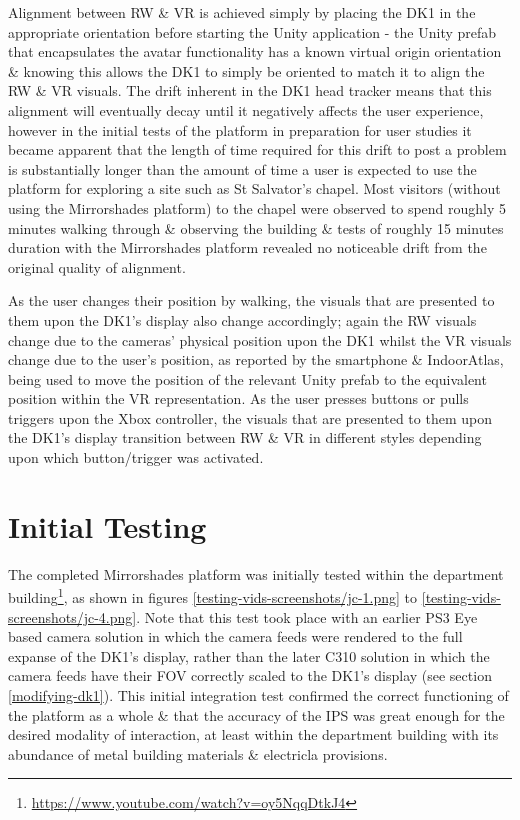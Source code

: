 Alignment between RW \& VR is achieved simply by placing the DK1 in the appropriate orientation before starting the Unity application - the Unity prefab that encapsulates the avatar functionality has a known virtual origin orientation \& knowing this allows the DK1 to simply be oriented to match it to align the RW \& VR visuals. The drift inherent in the DK1 head tracker means that this alignment will eventually decay until it negatively affects the user experience, however in the initial tests of the platform in preparation for user studies it became apparent that the length of time required for this drift to post a problem is substantially longer than the amount of time a user is expected to use the platform for exploring a site such as St Salvator's chapel. Most visitors (without using the Mirrorshades platform) to the chapel were observed to spend roughly 5 minutes walking through \& observing the building \& tests of roughly 15 minutes duration with the Mirrorshades platform revealed no noticeable drift from the original quality of alignment.

As the user changes their position by walking, the visuals that are presented to them upon the DK1's display also change accordingly; again the RW visuals change due to the cameras' physical position upon the DK1 whilst the VR visuals change due to the user's position, as reported by the smartphone \& IndoorAtlas, being used to move the position of the relevant Unity prefab to the equivalent position within the VR representation. As the user presses buttons or pulls triggers upon the Xbox controller, the visuals that are presented to them upon the DK1's display transition between RW \& VR in different styles depending upon which button/trigger was activated.


\section{Initial Testing}
\label{initial-testing}
The completed Mirrorshades platform was initially tested within the department building\footnote{\url{https://www.youtube.com/watch?v=oy5NqqDtkJ4}}, as shown in figures \ref{testing-vids-screenshots/jc-1.png} to \ref{testing-vids-screenshots/jc-4.png}. Note that this test took place with an earlier PS3 Eye based camera solution in which the camera feeds were rendered to the full expanse of the DK1's display, rather than the later C310 solution in which the camera feeds have their FOV correctly scaled to the DK1's display (see section \ref{modifying-dk1}). This initial integration test confirmed the correct functioning of the platform as a whole \& that the accuracy of the IPS was great enough for the desired modality of interaction, at least within the department building with its abundance of metal building materials \& electricla provisions.

